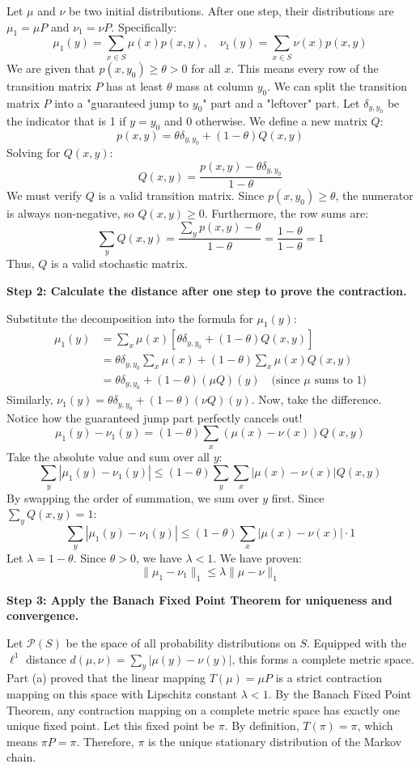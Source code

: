 \begin{solution}
Let $\mu$ and $\nu$ be two initial distributions. After one step, their distributions are $\mu_1 = \mu P$ and $\nu_1 = \nu P$. Specifically:
\[ \mu_1(y) = \sum_{x \in S} \mu(x) p(x, y), \quad \nu_1(y) = \sum_{x \in S} \nu(x) p(x, y) \]
We are given that $p(x, y_0) \geq \theta > 0$ for all $x$. This means every row of the transition matrix $P$ has at least $\theta$ mass at column $y_0$.
We can split the transition matrix $P$ into a "guaranteed jump to $y_0$" part and a "leftover" part. Let $\delta_{y, y_0}$ be the indicator that is 1 if $y=y_0$ and 0 otherwise. We define a new matrix $Q$:
\[ p(x, y) = \theta \delta_{y, y_0} + (1-\theta) Q(x, y) \]
Solving for $Q(x,y)$:
\[ Q(x,y) = \frac{p(x, y) - \theta \delta_{y, y_0}}{1-\theta} \]
We must verify $Q$ is a valid transition matrix. Since $p(x, y_0) \geq \theta$, the numerator is always non-negative, so $Q(x,y) \geq 0$. Furthermore, the row sums are:
\[ \sum_y Q(x, y) = \frac{\sum_y p(x,y) - \theta}{1-\theta} = \frac{1 - \theta}{1-\theta} = 1 \]
Thus, $Q$ is a valid stochastic matrix.

\textbf{Step 2: Calculate the distance after one step to prove the contraction.}

Substitute the decomposition into the formula for $\mu_1(y)$:
\begin{align*}
\mu_1(y) &= \sum_x \mu(x) \left[ \theta \delta_{y, y_0} + (1-\theta) Q(x, y) \right] \\
&= \theta \delta_{y, y_0} \sum_x \mu(x) + (1-\theta) \sum_x \mu(x) Q(x, y) \\
&= \theta \delta_{y, y_0} + (1-\theta) (\mu Q)(y) \quad \text{(since $\mu$ sums to 1)}
\end{align*}
Similarly, $\nu_1(y) = \theta \delta_{y, y_0} + (1-\theta) (\nu Q)(y)$.
Now, take the difference. Notice how the guaranteed jump part perfectly cancels out!
\[ \mu_1(y) - \nu_1(y) = (1-\theta) \sum_x (\mu(x) - \nu(x)) Q(x, y) \]
Take the absolute value and sum over all $y$:
\[ \sum_y |\mu_1(y) - \nu_1(y)| \leq (1-\theta) \sum_y \sum_x |\mu(x) - \nu(x)| Q(x, y) \]
By swapping the order of summation, we sum over $y$ first. Since $\sum_y Q(x,y) = 1$:
\[ \sum_y |\mu_1(y) - \nu_1(y)| \leq (1-\theta) \sum_x |\mu(x) - \nu(x)| \cdot 1 \]
Let $\lambda = 1-\theta$. Since $\theta > 0$, we have $\lambda < 1$. We have proven:
\[ \|\mu_1 - \nu_1\|_1 \leq \lambda \|\mu - \nu\|_1 \]

\textbf{Step 3: Apply the Banach Fixed Point Theorem for uniqueness and convergence.}

Let $\mathcal{P}(S)$ be the space of all probability distributions on $S$. Equipped with the $\ell^1$ distance $d(\mu, \nu) = \sum_y |\mu(y) - \nu(y)|$, this forms a complete metric space.
Part (a) proved that the linear mapping $T(\mu) = \mu P$ is a strict contraction mapping on this space with Lipschitz constant $\lambda < 1$.
By the Banach Fixed Point Theorem, any contraction mapping on a complete metric space has exactly one unique fixed point.
Let this fixed point be $\pi$. By definition, $T(\pi) = \pi$, which means $\pi P = \pi$. Therefore, $\pi$ is the unique stationary distribution of the Markov chain.


\end{solution}
